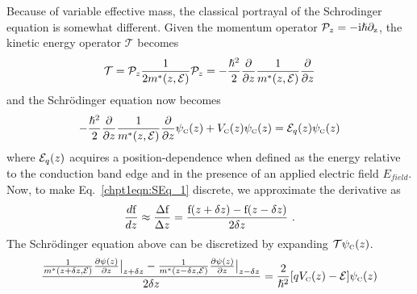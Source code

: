 \documentclass[12pt]{report}
\begin{document}
Because of variable effective mass, the classical portrayal of the Schrodinger equation is somewhat different.  Given the momentum operator $\mathcal{P}_z = -\rm{i} \hslash \partial_z$, the kinetic energy operator $\mathcal{T}$ becomes \cite{Sirtori:PRB:1994}
\begin{equation}
\mathcal{T} = \mathcal{P}_z \frac{1}{2 m^*(z,\EE)} \mathcal{P}_z =
-\frac{\hslash^2}{2} \frac{\partial}{\partial z} \frac{1}{m^*(z,\EE)} \frac{\partial}{\partial z}
\end{equation}
and the Schr\"{o}dinger equation now becomes
\begin{equation}
\label{chpt1eqn:SEq_1}
-\frac{\hslash^2}{2} \frac{\partial}{\partial z} \frac{1}{m^*(z,\EE)} \frac{\partial}{\partial z} \psi_\tn{\tiny{C}}(z) + V_\tn{\tiny{C}}(z) \psi_\tn{\tiny{C}}(z) = \EE_q(z) \psi_\tn{\tiny{C}}(z)
\end{equation}
where $\EE_q(z)$ acquires a position-dependence when defined as the energy relative to the conduction band edge and in the presence of an applied electric field $E_\textit{field}$.  Now, to make Eq.~\eqref{chpt1eqn:SEq_1} discrete, we approximate the derivative as
\begin{equation}
\label{chpt1eqn:discrete_derivative}
\frac{d \textnormal{f}}{dz} \approx \frac{\Delta \textnormal{f}}{\Delta z} = \frac{\textnormal{f}(z+\delta z) -\textnormal{f}(z-\delta z)}{2 \delta z} \text{~.}
\end{equation}
The Schr\"{o}dinger equation above can be discretized by expanding $\mathcal{T} \psi_{\textnormal{\tiny{C}}}(z)$.
\begin{equation}
\frac{\frac{1}{m^{*}(z+\delta z,\EE)} \frac{\partial \psi(z)}{\partial z} \big |_{z+\delta z} - \frac{1}{m^{*}(z-\delta z,\EE)} \frac{\partial \psi(z)}{\partial z} \big |_{z-\delta z}}{2 \delta z} = \frac{2}{\hslash^2}[q V_\tn{\tiny{C}}(z)-\EE]\psi_\tn{\tiny{C}}(z)
\end{equation}
\end{document}
